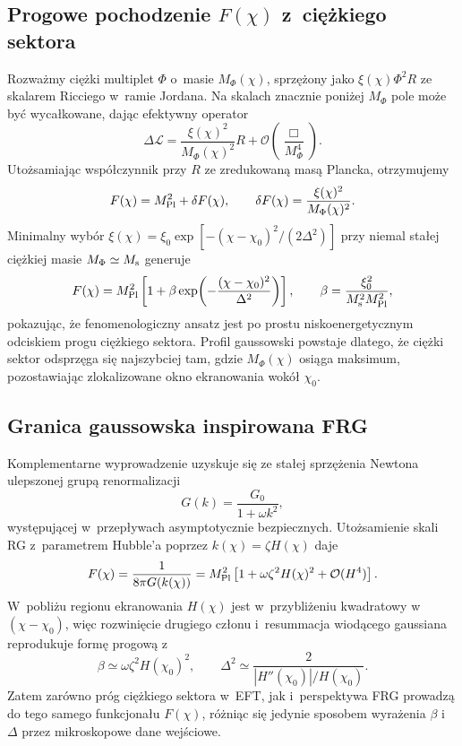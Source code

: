 \documentclass[11pt,a4paper]{article}
\begin{document}
\subsection{Progowe pochodzenie $F(\chi)$ z~ciężkiego sektora}
Rozważmy ciężki multiplet $\Phi$ o~masie $M_{\Phi}(\chi)$, sprzężony jako $\xi(\chi)\Phi^{2}R$ ze skalarem Ricciego w~ramie Jordana. Na skalach znacznie poniżej $M_{\Phi}$ pole może być wycałkowane, dając efektywny operator
\begin{equation}
\Delta\mathcal{L}=\frac{\xi(\chi)^{2}}{M_{\Phi}(\chi)^{2}}R+\mathcal{O}\!\left(\frac{\Box}{M_{\Phi}^{4}}\right).
\end{equation}
Utożsamiając współczynnik przy $R$ ze zredukowaną masą Plancka, otrzymujemy
\begin{equation}
F(\chi)=M_{\rm Pl}^{2}+\delta F(\chi),\qquad \delta F(\chi)=\frac{\xi(\chi)^{2}}{M_{\Phi}(\chi)^{2}}.
\end{equation}
Minimalny wybór $\xi(\chi)=\xi_{0}\exp[-(\chi-\chi_{0})^{2}/(2\Delta^{2})]$ przy niemal stałej ciężkiej masie $M_{\Phi}\simeq M_{\rm s}$ generuje
\begin{equation}
F(\chi)=M_{\rm Pl}^{2}\left[1+\beta\exp\!\left(-\frac{(\chi-\chi_{0})^{2}}{\Delta^{2}}\right)\right], \qquad \beta=\frac{\xi_{0}^{2}}{M_{\rm s}^{2}M_{\rm Pl}^{2}},
\end{equation}
pokazując, że fenomenologiczny ansatz jest po prostu niskoenergetycznym odciskiem progu ciężkiego sektora. Profil gaussowski powstaje dlatego, że ciężki sektor odsprzęga się najszybciej tam, gdzie $M_{\Phi}(\chi)$ osiąga maksimum, pozostawiając zlokalizowane okno ekranowania wokół $\chi_{0}$.

\subsection{Granica gaussowska inspirowana FRG}
Komplementarne wyprowadzenie uzyskuje się ze stałej sprzężenia Newtona ulepszonej grupą renormalizacji
\begin{equation}
G(k)=\frac{G_{0}}{1+\omega k^{2}},
\end{equation}
występującej w~przepływach asymptotycznie bezpiecznych. Utożsamienie skali RG z~parametrem Hubble'a poprzez $k(\chi)=\zeta H(\chi)$ daje
\begin{equation}
F(\chi)=\frac{1}{8\pi G(k(\chi))}=M_{\rm Pl}^{2}\left[1+\omega\zeta^{2}H(\chi)^{2}+ \mathcal{O}(H^{4})\right].
\end{equation}
W~pobliżu regionu ekranowania $H(\chi)$ jest w~przybliżeniu kwadratowy w~$(\chi-\chi_{0})$, więc rozwinięcie drugiego członu i~resummacja wiodącego gaussiana reprodukuje formę progową z
\begin{equation}
\beta\simeq \omega \zeta^{2} H(\chi_{0})^{2},\qquad \Delta^{2}\simeq \frac{2}{|H''(\chi_{0})|/H(\chi_{0})}.
\end{equation}
Zatem zarówno próg ciężkiego sektora w~EFT, jak i~perspektywa FRG prowadzą do tego samego funkcjonału $F(\chi)$, różniąc się jedynie sposobem wyrażenia $\beta$ i~$\Delta$ przez mikroskopowe dane wejściowe.
\end{document}
